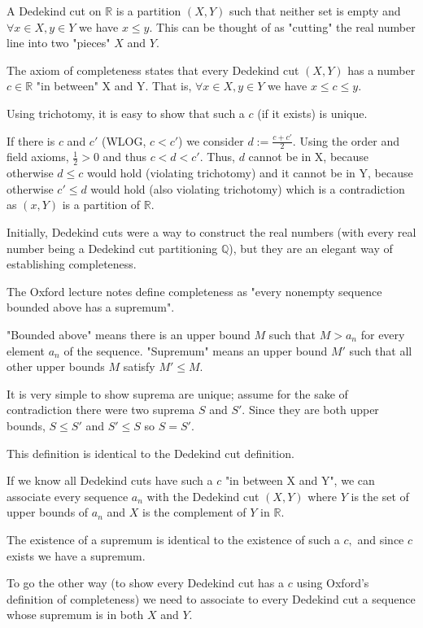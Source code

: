 \documentclass{article}
\newcommand{\0}{{\bf{0}}}
\begin{document}
A Dedekind cut on $\mathbb{R}$ is a partition $(X, Y)$ such that neither set is empty and $\forall x \in X, y \in Y$ we have $x \leq y.$
This can be thought of as "cutting" the real number line into two "pieces" $X$ and $Y.$

The axiom of completeness states that every Dedekind cut $(X, Y)$ has a number $c \in \mathbb{R}$ "in between" X and Y. That is, $\forall x \in X, y \in Y$ we have $x \leq c \leq y.$

Using trichotomy, it is easy to show that such a $c$ (if it exists) is unique.

If there is $c$ and $c'$ (WLOG, $c < c'$) we consider $d := \frac{c + c'}{2}.$
Using the order and field axioms, $\frac{1}{2} > 0$ and thus $c < d < c'.$
Thus, $d$ cannot be in X, because otherwise $d \leq c$ would hold (violating trichotomy) and it cannot be in Y, because otherwise $c' \leq d$ would hold (also violating trichotomy) which is a contradiction as $(x, Y)$ is a partition of $\mathbb{R}.$

Initially, Dedekind cuts were a way to construct the real numbers (with every real number being a Dedekind cut partitioning $\mathbb{Q}$), but they are an elegant way of establishing completeness. 

The Oxford lecture notes define completeness as "every nonempty sequence bounded above has a supremum".

"Bounded above" means there is an upper bound $M$ such that $M > a_n$ for every element $a_n$ of the sequence.
"Supremum" means an upper bound $M'$ such that all other upper bounds $M$ satisfy $M' \leq M.$

It is very simple to show suprema are unique; assume for the sake of contradiction there were two suprema $S$ and $S'.$ Since they are both upper bounds, $S \leq S'$ and $S' \leq S$ so $S = S'.$

This definition is identical to the Dedekind cut definition.

If we know all Dedekind cuts have such a $c$ "in between X and Y", we can associate every sequence $a_n$ with the Dedekind cut $(X, Y)$ where $Y$ is the set of upper bounds of $a_n$ and $X$ is the complement of $Y$ in $\mathbb{R}.$

The existence of a supremum is identical to the existence of such a $c,$ and since $c$ exists we have a supremum.

To go the other way (to show every Dedekind cut has a $c$ using Oxford's definition of completeness) we need to associate to every Dedekind cut a sequence whose supremum is in both $X$ and $Y.$
\end{document}
